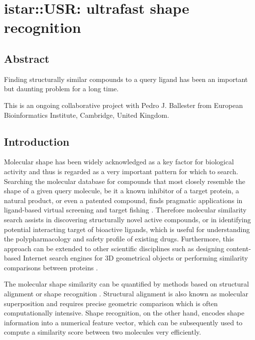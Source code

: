 \chapter{istar::USR: ultrafast shape recognition}

\section{Abstract}

Finding structurally similar compounds to a query ligand has been an important but daunting problem for a long time.

This is an ongoing collaborative project with Pedro J. Ballester from European Bioinformatics Institute, Cambridge, United Kingdom.

\section{Introduction}

Molecular shape has been widely acknowledged as a key factor for biological activity and thus is regarded as a very important pattern for which to search. Searching the molecular database for compounds that most closely resemble the shape of a given query molecule, be it a known inhibitor of a target protein, a natural product, or even a patented compound, finds pragmatic applications in ligand-based virtual screening \citep{1332,1380} and target fishing \citep{1407,1408,1402}. Therefore molecular similarity search assists in discovering structurally novel active compounds, or in identifying potential interacting target of bioactive ligands, which is useful for understanding the polypharmacology and safety profile of existing drugs. Furthermore, this approach can be extended to other scientific disciplines such as designing content-based Internet search engines for 3D geometrical objects or performing similarity comparisons between proteins \citep{1280}.

The molecular shape similarity can be quantified by methods based on structural alignment \citep{1440,887,1439} or shape recognition \citep{1379,1338,1331}. Structural alignment is also known as molecular superposition and requires precise geometric comparison which is often computationally intensive. Shape recognition, on the other hand, encodes shape information into a numerical feature vector, which can be subsequently used to compute a similarity score between two molecules very efficiently.%

